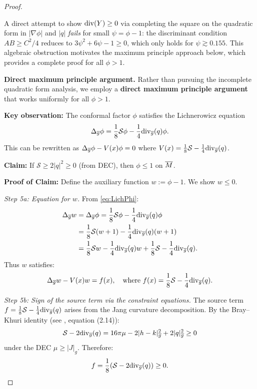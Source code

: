 \begin{proof}
\begin{remark}\label{rem:CompletingSquareFails}
A direct attempt to show $\mathrm{div}(Y) \ge 0$ via completing the square on the quadratic form in $|\nabla\phi|$ and $|q|$ \emph{fails} for small $\psi = \phi - 1$: the discriminant condition $AB \ge C^2/4$ reduces to $3\psi^2 + 6\psi - 1 \ge 0$, which only holds for $\psi \gtrsim 0.155$. This algebraic obstruction motivates the maximum principle approach below, which provides a complete proof for all $\phi > 1$.
\end{remark}

\textbf{Direct maximum principle argument.} Rather than pursuing the incomplete quadratic form analysis, we employ a \textbf{direct maximum principle argument} that works uniformly for all $\phi > 1$.

\textbf{Key observation:} The conformal factor $\phi$ satisfies the Lichnerowicz equation
\begin{equation}\label{eq:LichPhi}
    \Delta_{\overline{g}}\phi = \frac{1}{8}\mathcal{S}\phi - \frac{1}{4}\mathrm{div}_{\overline{g}}(q)\phi.
\end{equation}
This can be rewritten as $\Delta_{\overline{g}}\phi - V(x)\phi = 0$ where $V(x) = \frac{1}{8}\mathcal{S} - \frac{1}{4}\mathrm{div}_{\overline{g}}(q)$.

\textbf{Claim:} If $\mathcal{S} \ge 2|q|^2 \ge 0$ (from DEC), then $\phi \le 1$ on $\overline{M}$.

\textbf{Proof of Claim:} Define the auxiliary function $w := \phi - 1$. We show $w \le 0$.

\textit{Step 5a: Equation for $w$.} From \eqref{eq:LichPhi}:
\begin{align}
    \Delta_{\overline{g}} w &= \Delta_{\overline{g}}\phi = \frac{1}{8}\mathcal{S}\phi - \frac{1}{4}\mathrm{div}_{\overline{g}}(q)\phi \\
    &= \frac{1}{8}\mathcal{S}(w+1) - \frac{1}{4}\mathrm{div}_{\overline{g}}(q)(w+1) \\
    &= \frac{1}{8}\mathcal{S}w - \frac{1}{4}\mathrm{div}_{\overline{g}}(q)w + \frac{1}{8}\mathcal{S} - \frac{1}{4}\mathrm{div}_{\overline{g}}(q).
\end{align}
Thus $w$ satisfies:
\begin{equation}\label{eq:wEquation}
    \Delta_{\overline{g}} w - V(x) w = f(x), \quad \text{where } f(x) = \frac{1}{8}\mathcal{S} - \frac{1}{4}\mathrm{div}_{\overline{g}}(q).
\end{equation}

\textit{Step 5b: Sign of the source term via the constraint equations.}
The source term $f = \frac{1}{8}\mathcal{S} - \frac{1}{4}\mathrm{div}_{\overline{g}}(q)$ arises from the Jang curvature decomposition. By the Bray--Khuri identity (see \cite{braykhuri2010}, equation (2.14)):
\begin{equation}
    \mathcal{S} - 2\mathrm{div}_{\overline{g}}(q) = 16\pi\mu - 2|h - k|_{\overline{g}}^2 + 2|q|_{\overline{g}}^2 \ge 0
\end{equation}
under the DEC $\mu \ge |J|_g$. Therefore:
\begin{equation}
    f = \frac{1}{8}(\mathcal{S} - 2\mathrm{div}_{\overline{g}}(q)) \ge 0.
\end{equation}


\end{proof}
